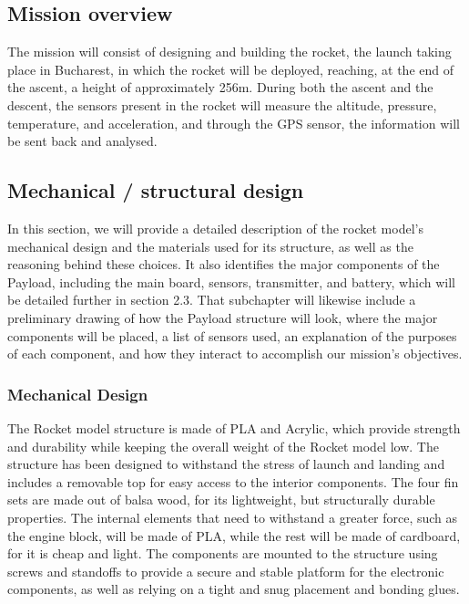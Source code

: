 \subsection{Mission overview}

The mission will consist of designing and building the rocket, the launch taking place in Bucharest, in which the rocket will be deployed, reaching, at the end of the ascent, a height of approximately 256m. During both the ascent and the descent, the sensors present in the rocket will measure the altitude, pressure, temperature, and acceleration, and through the GPS sensor, the information will be sent back and analysed. 

\subsection{Mechanical / structural design}

In this section, we will provide a detailed description of the rocket model’s mechanical design and the materials used for its structure, as well as the reasoning behind these choices. It also identifies the major components of the Payload, including the main board, sensors, transmitter, and battery, which will be detailed further in section 2.3. That subchapter will likewise include a preliminary drawing of how the Payload structure will look, where the major components will be placed, a list of sensors used, an explanation of the purposes of each component, and how they interact to accomplish our mission’s objectives.

\subsubsection{Mechanical Design}

The Rocket model structure is made of PLA and Acrylic, which provide strength and durability while keeping the overall weight of the Rocket model low. The structure has been designed to withstand the stress of launch and landing and includes a removable top for easy access to the interior components. The four fin sets are made out of balsa wood, for its lightweight, but structurally durable properties. The internal elements that need to withstand a greater force, such as the engine block, will be made of PLA, while the rest will be made of cardboard, for it is cheap and light. The components are mounted to the structure using screws and standoffs to provide a secure and stable platform for the electronic components, as well as relying on a tight and snug placement and bonding glues.

